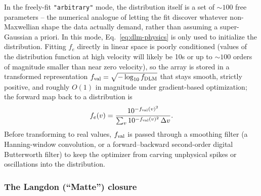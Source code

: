 \documentclass[11pt]{article}
\newcommand{\code}[1]{\texttt{#1}}
\begin{document}
In the freely-fit \code{"arbitrary"} mode, the
distribution itself is a set of $\sim\!100$ free parameters -- the numerical analogue of
letting the fit discover whatever non-Maxwellian shape the data actually demand, rather
than assuming a super-Gaussian a priori. In this mode, Eq.~\ref{eq:dlm-physics} is only used to initialize the distribution. Fitting $f_e$ directly in linear space is poorly
conditioned (values of the distribution function at high velocity will likely be 10s or up to $\sim100$ orders of magnitude smaller than near zero velocity), so the array is stored in a transformed
representation $f_{\rm val}=\sqrt{-\log_{10}f_{\rm DLM}}$ that stays smooth, strictly
positive, and roughly $O(1)$ in magnitude under gradient-based optimization; the forward
map back to a distribution is
\begin{equation}
  f_e(v) = \frac{10^{-f_{\rm val}(v)^2}}{\sum_v 10^{-f_{\rm val}(v)^2}\,\Delta v}.
\end{equation}
Before transforming to real values, $f_{\rm val}$ is passed through a smoothing filter (a Hanning-window convolution, or a
forward--backward second-order digital Butterworth filter) to keep the optimizer from
carving unphysical spikes or oscillations into the distribution.

\subsubsection{The Langdon (``Matte'') closure}
\end{document}

